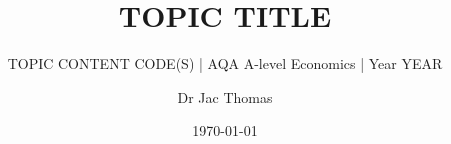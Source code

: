 %

\documentclass[16pt,aspectratio=169]{beamer}

\usepackage{graphicx}
\graphicspath{{../../assets/images/}{./figures/}}
\usepackage{booktabs}
\usepackage{tikz}
\usepackage{pgfplots}
\pgfplotsset{compat=1.18}


\title{TOPIC TITLE}
\subtitle{TOPIC CONTENT CODE(S) | AQA A-level Economics | Year YEAR}
\author{Dr Jac Thomas}
\date{\today}



\begin{frame}
    \titlepage
\end{frame}

\begin{frame}{Learning Objectives}
    \textbf{To be able to\ldots}
    \begin{itemize}
        \item OBJECTIVE 1
        \item OBJECTIVE 2
        \item OBJECTIVE 3
    \end{itemize}
\end{frame}

\begin{frame}{General Frame}
	Some example paragraph text
	\begin{itemize}
		\item POINT 1
		\item POINT 2
		\item POINT 3
	\end{itemize}
\end{frame}


